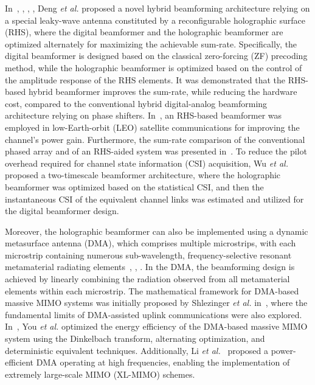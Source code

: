 \documentclass[lettersize,journal]{IEEEtran}
\theoremstyle{remark}
\begin{document}
In~\cite{deng2021reconfigurable_tvt}, \cite{deng2022hdma}, \cite{deng2022reconfigurable_twc}, \cite{hu2022holographic}, Deng \textit{et al.} proposed a novel hybrid beamforming architecture relying on a special leaky-wave antenna constituted by a reconfigurable holographic surface (RHS), where the digital beamformer and the holographic beamformer are optimized alternately for maximizing the achievable sum-rate. Specifically, the digital beamformer is designed based on the classical zero-forcing (ZF) precoding method, while the holographic beamformer is optimized based on the control of the amplitude response of the RHS elements. It was demonstrated that the RHS-based hybrid beamformer improves the sum-rate, while reducing the hardware cost, compared to the conventional hybrid digital-analog beamforming architecture relying on phase shifters. In~\cite{deng2022holographic}, an RHS-based beamformer was employed in low-Earth-orbit (LEO) satellite communications for improving the channel's power gain. Furthermore, the sum-rate comparison of the conventional phased array and of an RHS-aided system was presented in~\cite{hu2023holographic}. To reduce the pilot overhead required for channel state information (CSI) acquisition, Wu \textit{et al.}~\cite{wu2024two} proposed a two-timescale beamformer architecture, where the holographic beamformer was optimized based on the statistical CSI, and then the instantaneous CSI of the equivalent channel links was estimated and utilized for the digital beamformer design.

Moreover, the holographic beamformer can also be implemented using a dynamic metasurface antenna (DMA), which comprises multiple microstrips, with each microstrip containing numerous sub-wavelength, frequency-selective resonant metamaterial radiating elements~\cite{shlezinger2019dynamic}, \cite{you2022energy}, \cite{li2023near}. In the DMA, the beamforming design is achieved by linearly combining the radiation observed from all metamaterial elements within each microstrip. The mathematical framework for DMA-based massive MIMO systems was initially proposed by Shlezinger \textit{et al.} in~\cite{shlezinger2019dynamic}, where the fundamental limits of DMA-assisted uplink communications were also explored. In~\cite{you2022energy}, You \textit{et al.} optimized the energy efficiency of the DMA-based massive MIMO system using the Dinkelbach transform, alternating optimization, and deterministic equivalent techniques. Additionally, Li \textit{et al.}~\cite{li2023near} proposed a power-efficient DMA operating at high frequencies, enabling the implementation of extremely large-scale MIMO (XL-MIMO) schemes.
\end{document}
